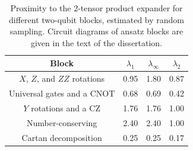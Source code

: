 \begin{table}
    \centering
    \begin{tabular}{|c|c|c|c|}
    \hline
        Block & 
        $\lambda_1$ & $\lambda_\infty$ & $\lambda_2$\\
        \hline
        $X$, $Z$, and $ZZ$ rotations &  
        0.95 & 1.80 & 0.87\\
        \hline 
        Universal gates and a CNOT &
        0.68 & 0.69 & 0.42\\
        \hline
        $Y$ rotations and a CZ \cite{cerezo_cost-function-dependent_2020} &            
            1.76 & 1.76 & 1.00\\
        \hline
        Number-conserving \cite{barkoutsos_quantum_2018} & 
        2.40 & 2.40 & 1.00\\
        \hline
        Cartan decomposition \cite{khaneja_cartan_2000,khaneja_time_2001} &
            0.25 & 0.25 & 0.17\\
    \hline
    \end{tabular}
    \caption{Proximity to the 2-tensor product expander for different two-qubit blocks, estimated by random sampling. Circuit diagrams of ansatz blocks are given in the text of the dissertation.}
    \label{tab:local_designs}
\end{table}


